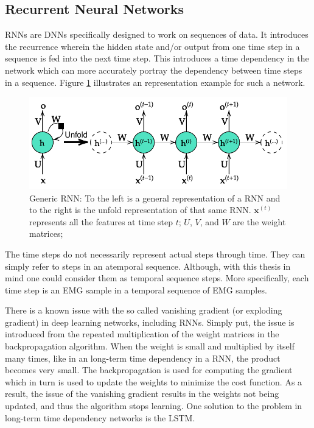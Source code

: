 \documentclass[../main.tex]{subfiles}
\begin{document}
\subsection{Recurrent Neural Networks}
\label{sec:A-rnn}
\Acp{RNN} are \acp{DNN} specifically designed to work on sequences of data.
It introduces the recurrence wherein the hidden state and/or output from one time step in a sequence is fed into the next time step.
This introduces a time dependency in the network which can more accurately portray the dependency between time steps in a sequence.
Figure \ref{fig:generic-rnn} illustrates an representation example for such a network.
\begin{figure}[ht]
    \centering
    \includegraphics{img/generic-rnn-diagram}
    \caption{Generic \ac{RNN}: To the left is a general representation of a \ac{RNN} and to the right is the unfold representation of that same \ac{RNN}. $\mathbf{x}^{(t)}$ represents all the features at time step $t$; $U$, $V$, and $W$ are the weight matrices;}
    \label{fig:generic-rnn}
\end{figure}

The time steps do not necessarily represent actual steps through time.
They can simply refer to steps in an atemporal sequence.
Although, with this thesis in mind one could consider them as temporal sequence steps.
More specifically, each time step is an \ac{EMG} sample in a temporal sequence of \ac{EMG} samples.

There is a known issue with the so called vanishing gradient (or exploding gradient) in deep learning networks, including \acp{RNN}.
Simply put, the issue is introduced from the repeated multiplication of the weight matrices in the backpropagation algorithm.
When the weight is small and multiplied by itself many times, like in an long-term time dependency in a \ac{RNN}, the product becomes very small.
The backpropagation is used for computing the gradient which in turn is used to update the weights to minimize the cost function.
As a result, the issue of the vanishing gradient results in the weights not being updated, and thus the algorithm stops learning.
One solution to the problem in long-term time dependency networks is the \ac{LSTM}.
\end{document}
